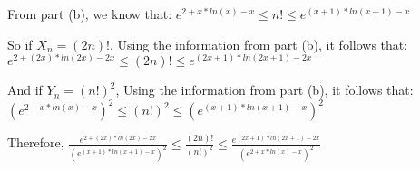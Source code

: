 \documentclass[11pt]{article}
\begin{document}
\begin{enumerate}
\begin{enumerate}
{      From part (b), we know that: \newline
      $e^{2 + x*ln(x) - x} \leq n! \leq e^{(x+1)*ln(x+1) - x}$ \newline
      \newline

      So if $X_n = (2n)!$, \newline
      Using the information from part (b), it follows that: \newline
      $e^{2 + (2x)*ln(2x) - 2x} \leq (2n)! \leq e^{(2x+1)*ln(2x+1) - 2x}$ \newline
      \newline

      And if $Y_n = (n!)^2$, \newline
      Using the information from part (b), it follows that: \newline
      $(e^{2 + x*ln(x) - x})^2 \leq (n!)^2 \leq (e^{(x+1)*ln(x+1) - x})^2$ \newline
      \newline

      Therefore, \newline
      $\frac{e^{2 + (2x)*ln(2x) - 2x}}{(e^{(x+1)*ln(x+1) - x})^2}
      \leq
      \frac{(2n)!}{(n!)^2}
      \leq
      \frac{e^{(2x+1)*ln(2x+1) - 2x}}{(e^{2 + x*ln(x) - x})^2}
      $
    }
  \newpage  
  \end{enumerate} 
  


   


\end{enumerate}
\end{document}
